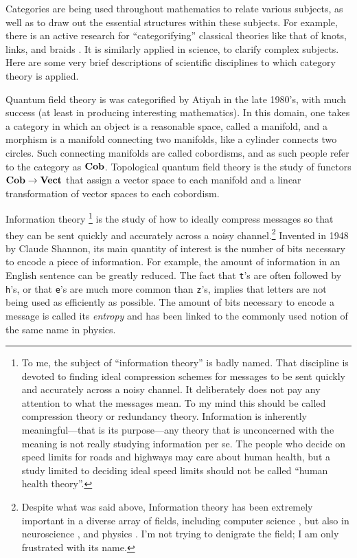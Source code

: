 Categories are being used throughout mathematics to relate various subjects, as well as to draw out the essential structures within these subjects. For example, there is an active research for “categorifying” classical theories like that of knots, links, and braids \cite{Kho}. It is similarly applied in science, to clarify complex subjects. Here are some very brief descriptions of scientific disciplines to which category theory is applied.

Quantum field theory is was categorified by Atiyah \cite{Ati} in the late 1980's, with much success (at least in producing interesting mathematics). In this domain, one takes a category in which an object is a reasonable space, called a manifold, and a morphism is a manifold connecting two manifolds, like a cylinder connects two circles. Such connecting manifolds are called cobordisms, and as such people refer to the category as ${\bf Cob}$. Topological quantum field theory is the study of functors ${\bf Cob}\rightarrow{\bf Vect}$ that assign a vector space to each manifold and a linear transformation of vector spaces to each cobordism. 

Information theory 
\footnote{To me, the subject of “information theory” is badly named. That discipline is devoted to finding ideal compression schemes for messages to be sent quickly and accurately across a noisy channel. It deliberately does not pay any attention to what the messages mean. To my mind this should be called compression theory or redundancy theory. Information is inherently meaningful—that is its purpose—any theory that is unconcerned with the meaning is not really studying information per se. The people who decide on speed limits for roads and highways may care about human health, but a study limited to deciding ideal speed limits should not be called “human health theory”.} 
is the study of how to ideally compress messages so that they can be sent quickly and accurately across a noisy channel.\footnote{Despite what was said above, Information theory has been extremely important in a diverse array of fields, including computer science \cite{MacK}, but also in neuroscience \cite{Bar}, \cite{Lin} and physics \cite{Eve}. I'm not trying to denigrate the field; I am only frustrated with its name.} Invented in 1948 by Claude Shannon, its main quantity of interest is the number of bits necessary to encode a piece of information. For example, the amount of information in an English sentence can be greatly reduced. The fact that {\tt t}'s are often followed by {\tt h}'s, or that {\tt e}'s are much more common than {\tt z}'s, implies that letters are not being used as efficiently as possible. The amount of bits necessary to encode a message is called its {\em entropy} and has been linked to the commonly used notion of the same name in physics. 

